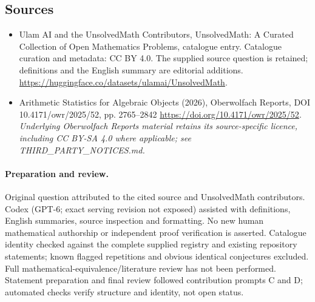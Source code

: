 \documentclass[11pt]{article}
\begin{document}
\subsection{Sources}
\begin{itemize}
\item[\hypertarget{source:statement:1}{S1}] Ulam AI and the UnsolvedMath Contributors, UnsolvedMath: A Curated Collection of Open Mathematics Problems, catalogue entry. Catalogue curation and metadata: CC BY 4.0. The supplied source question is retained; definitions and the English summary are editorial additions.
\url{https://huggingface.co/datasets/ulamai/UnsolvedMath}.
\item[\hypertarget{source:statement:2}{S2}] Arithmetic Statistics for Algebraic Objects (2026), Oberwolfach Reports, DOI 10.4171/owr/2025/52, pp. 2765--2842
\url{https://doi.org/10.4171/owr/2025/52}.
\textit{Underlying Oberwolfach Reports material retains its source-specific licence, including CC BY-SA 4.0 where applicable; see THIRD\_PARTY\_NOTICES.md.}
\end{itemize}
\paragraph{Preparation and review.}
Original question attributed to the cited source and UnsolvedMath contributors. Codex (GPT-6; exact serving revision not exposed) assisted with definitions, English summaries, source inspection and formatting. No new human mathematical authorship or independent proof verification is asserted. Catalogue identity checked against the complete supplied registry and existing repository statements; known flagged repetitions and obvious identical conjectures excluded. Full mathematical-equivalence/literature review has not been performed. Statement preparation and final review followed contribution prompts C and D; automated checks verify structure and identity, not open status.
\label{end:statement}
\end{document}
